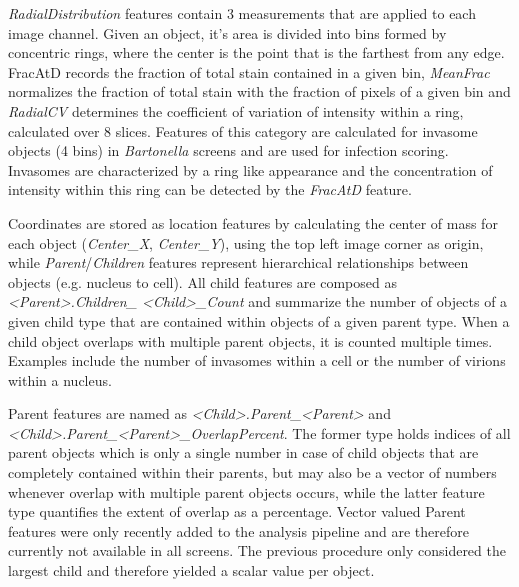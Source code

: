 \textit{RadialDistribution} features contain 3 measurements that are applied to each image channel. Given an object, it's area is divided into bins formed by concentric rings, where the center is the point that is the farthest from any edge. FracAtD records the fraction of total stain contained in a given bin, \textit{MeanFrac} normalizes the fraction of total stain with the fraction of pixels of a given bin and \textit{RadialCV} determines the coefficient of variation of intensity within a ring, calculated over 8 slices. Features of this category are calculated for invasome objects (4 bins) in \textit{Bartonella} screens and are used for infection scoring. Invasomes are characterized by a ring like appearance and the concentration of intensity within this ring can be detected by the \textit{FracAtD} feature.

Coordinates are stored as location features by calculating the center of mass for each object (\textit{Center\_X}, \textit{Center\_Y}), using the top left image corner as origin, while \textit{Parent}\slash \textit{Children} features represent hierarchical relationships between objects (e.g. nucleus to cell). All child features are composed as \textit{<Parent>.Children\_ <Child>\_Count} and summarize the number of objects of a given child type that are contained within objects of a given parent type. When a child object overlaps with multiple parent objects, it is counted multiple times. Examples include the number of invasomes within a cell or the number of virions within a nucleus. 

Parent features are named as \textit{<Child>.Parent\_<Parent>} and \textit{<Child>.Parent\_<Par\-ent>\_OverlapPercent}. The former type holds indices of all parent objects which is only a single number in case of child objects that are completely contained within their parents, but may also be a vector of numbers whenever overlap with multiple parent objects occurs, while the latter feature type quantifies the extent of overlap as a percentage. Vector valued Parent features were only recently added to the analysis pipeline and are therefore currently not available in all screens. The previous procedure only considered the largest child and therefore yielded a scalar value per object.

